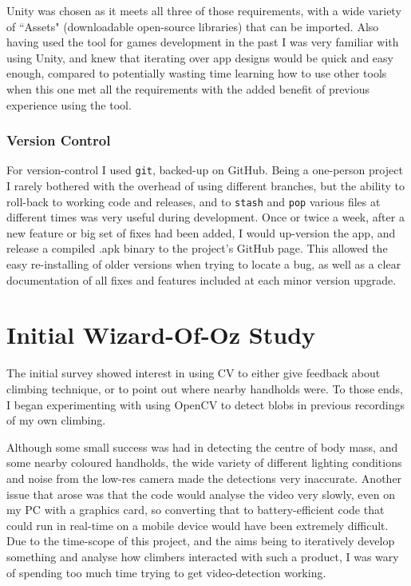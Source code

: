 Unity was chosen as it meets all three of those requirements, with a wide variety of ``Assets" (downloadable open-source libraries) that can be imported.
Also having used the tool for games development in the past I was very familiar with using Unity, and knew that iterating over app designs would be quick and easy enough, compared to potentially wasting time learning how to use other tools when this one met all the requirements with the added benefit of previous experience using the tool.

\subsubsection{Version Control}
For version-control I used \verb|git|, backed-up on GitHub.
Being a one-person project I rarely bothered with the overhead of using different branches, but the ability to roll-back to working code and releases, and to \verb|stash| and \verb|pop| various files at different times was very useful during development.
Once or twice a week, after a new feature or big set of fixes had been added, I would up-version the app, and release a compiled .apk binary to the project's GitHub page.
This allowed the easy re-installing of older versions when trying to locate a bug, as well as a clear documentation of all fixes and features included at each minor version upgrade.


\section{Initial Wizard-Of-Oz Study}
The initial survey showed interest in using CV to either give feedback about climbing technique, or to point out where nearby handholds were.
To those ends, I began experimenting with using OpenCV to detect blobs in previous recordings of my own climbing.

Although some small success was had in detecting the centre of body mass, and some nearby coloured handholds, the wide variety of different lighting conditions and noise from the low-res camera made the detections very inaccurate.
Another issue that arose was that the code would analyse the video very slowly, even on my PC with a graphics card, so converting that to battery-efficient code that could run in real-time on a mobile device would have been extremely difficult.
Due to the time-scope of this project, and the aims being to iteratively develop something and analyse how climbers interacted with such a product, I was wary of spending too much time trying to get video-detection working.


